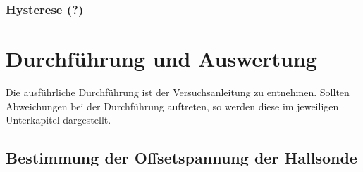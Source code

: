 \documentclass[11pt, a4paper]{article}
\numberwithin{equation}{section}
\begin{document}
\subsubsection{Hysterese (?)}


\section{Durchführung und Auswertung}
Die ausführliche Durchführung ist der Versuchsanleitung \cite{anleitung} zu entnehmen.
Sollten Abweichungen bei der Durchführung auftreten, so werden diese im jeweiligen Unterkapitel dargestellt.

\subsection{Bestimmung der Offsetspannung der Hallsonde}
\label{ssec:offsetspannung}
\end{document}
